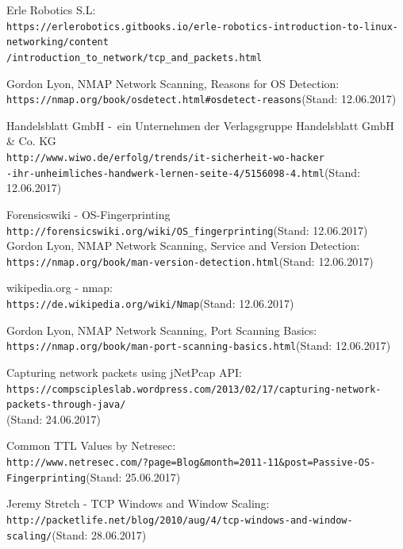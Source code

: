 \documentclass{article} %
\begin{document}
\begin{thebibliography}{9}
 
 
Erle Robotics S.L:
\\\texttt{https://erlerobotics.gitbooks.io/erle-robotics-introduction-to-linux-networking/content\\/introduction\_to\_network/tcp\_and\_packets.html}

Gordon Lyon, NMAP Network Scanning, Reasons for OS Detection:
\\\texttt{https://nmap.org/book/osdetect.html\#osdetect-reasons}(Stand: 12.06.2017)

Handelsblatt GmbH -\
ein Unternehmen der Verlagsgruppe Handelsblatt GmbH \& Co. KG
\\\texttt{http://www.wiwo.de/erfolg/trends/it-sicherheit-wo-hacker\\-ihr-unheimliches-handwerk-lernen-seite-4/5156098-4.html}(Stand: 12.06.2017)

Forensicswiki - OS-Fingerprinting
\\\texttt{http://forensicswiki.org/wiki/OS\_fingerprinting}(Stand: 12.06.2017)
\bibitem{nmap_version_detection} 
Gordon Lyon, NMAP Network Scanning, Service and Version Detection:
\\\texttt{https://nmap.org/book/man-version-detection.html}(Stand: 12.06.2017)

wikipedia.org - nmap:
\\\texttt{https://de.wikipedia.org/wiki/Nmap}(Stand: 12.06.2017)

Gordon Lyon, NMAP Network Scanning, Port Scanning Basics:
\\\texttt{https://nmap.org/book/man-port-scanning-basics.html}(Stand: 12.06.2017)

Capturing network packets using jNetPcap API:
\\\texttt{https://compscipleslab.wordpress.com/2013/02/17/capturing-network-packets-through-java/}\\(Stand: 24.06.2017)

Common TTL Values by Netresec:
\\\texttt{http://www.netresec.com/?page=Blog\&month=2011-11\&post=Passive-OS-Fingerprinting}(Stand: 25.06.2017)

Jeremy Stretch - TCP Windows and Window Scaling:
\\\texttt{http://packetlife.net/blog/2010/aug/4/tcp-windows-and-window-scaling/}(Stand: 28.06.2017)

\end{thebibliography}
\newpage
\end{document}
